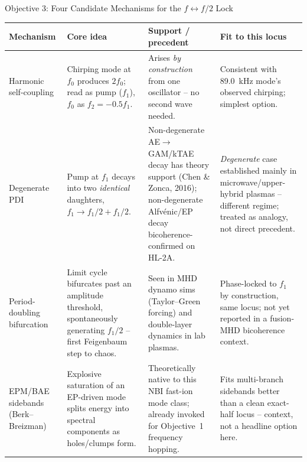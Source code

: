 \documentclass[aspectratio=169]{beamer}
\begin{document}
\begin{frame}{Objective 3: Four Candidate Mechanisms for the $f \leftrightarrow f/2$ Lock}
    \tiny
    \renewcommand{\arraystretch}{1.1}
    \setlength{\tabcolsep}{4pt}
    \begin{tabularx}{\textwidth}{@{}p{1.9cm}XXX@{}}
        \toprule
        \textbf{Mechanism} & \textbf{Core idea} & \textbf{Support / precedent} & \textbf{Fit to this locus} \\
        \midrule
        Harmonic self-coupling &
        Chirping mode at $f_0$ produces $2f_0$; read as pump ($f_1$), $f_0$ as $f_2=-0.5f_1$. &
        Arises \emph{by construction} from one oscillator -- no second wave needed. &
        Consistent with \SI{89.0}{\kilo\hertz} mode's observed chirping; simplest option. \\
        \addlinespace
        Degenerate PDI &
        Pump at $f_1$ decays into two \emph{identical} daughters, $f_1 \rightarrow f_1/2+f_1/2$. &
        Non-degenerate AE$\to$GAM/kTAE decay has theory support (Chen \& Zonca, 2016); non-degenerate Alfv\'enic/EP decay bicoherence-confirmed on HL-2A. &
        \emph{Degenerate} case established mainly in microwave/upper-hybrid plasmas -- different regime; treated as analogy, not direct precedent. \\
        \addlinespace
        Period-doubling bifurcation &
        Limit cycle bifurcates past an amplitude threshold, spontaneously generating $f_1/2$ -- first Feigenbaum step to chaos. &
        Seen in MHD dynamo sims (Taylor--Green forcing) and double-layer dynamics in lab plasmas. &
        Phase-locked to $f_1$ by construction, same locus; not yet reported in a fusion-MHD bicoherence context. \\
        \addlinespace
        EPM/BAE sidebands (Berk--Breizman) &
        Explosive saturation of an EP-driven mode splits energy into spectral components as holes/clumps form. &
        Theoretically native to this NBI fast-ion mode class; already invoked for Objective~1 frequency hopping. &
        Fits multi-branch sidebands better than a clean exact-half locus -- context, not a headline option here. \\
        \bottomrule
    \end{tabularx}
\end{frame}
\end{document}
